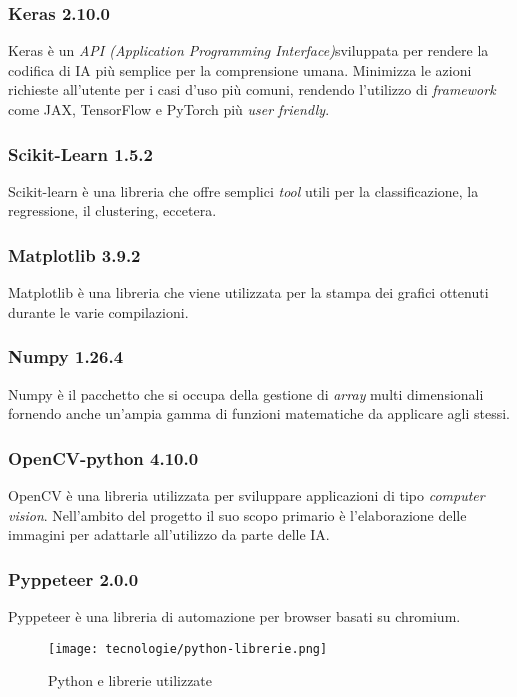 \subsubsection{Keras 2.10.0}
Keras è un \emph{API (Application Programming Interface)}\glsfirstoccur sviluppata per rendere la codifica di IA più semplice per la comprensione umana. 
Minimizza le azioni richieste all'utente per i casi d'uso più comuni, rendendo l'utilizzo di \emph{framework} come JAX, TensorFlow e PyTorch più \emph{user friendly}.

\subsubsection{Scikit-Learn 1.5.2}
Scikit-learn è una libreria che offre semplici \emph{tool} utili per la classificazione, la regressione, il clustering, eccetera.

\subsubsection{Matplotlib 3.9.2}
Matplotlib è una libreria che viene utilizzata per la stampa dei grafici ottenuti durante le varie compilazioni. 

\subsubsection{Numpy 1.26.4}
Numpy è il pacchetto che si occupa della gestione di \emph{array} multi dimensionali fornendo anche un'ampia gamma di funzioni matematiche da applicare agli stessi.

\subsubsection{OpenCV-python 4.10.0}
OpenCV è una libreria utilizzata per sviluppare applicazioni di tipo \emph{computer vision}\glsfirstoccur. Nell'ambito del progetto il suo scopo primario è l'elaborazione delle immagini per adattarle all'utilizzo da parte delle IA. 

\subsubsection{Pyppeteer 2.0.0}
Pyppeteer è una libreria di automazione per browser basati su chromium.

\begin{figure}[!h] 
  \centering 
  \texttt{[image: tecnologie/python-librerie.png]} 
  \caption{Python e librerie utilizzate}
  \label{fig:logo-python}
\end{figure}


